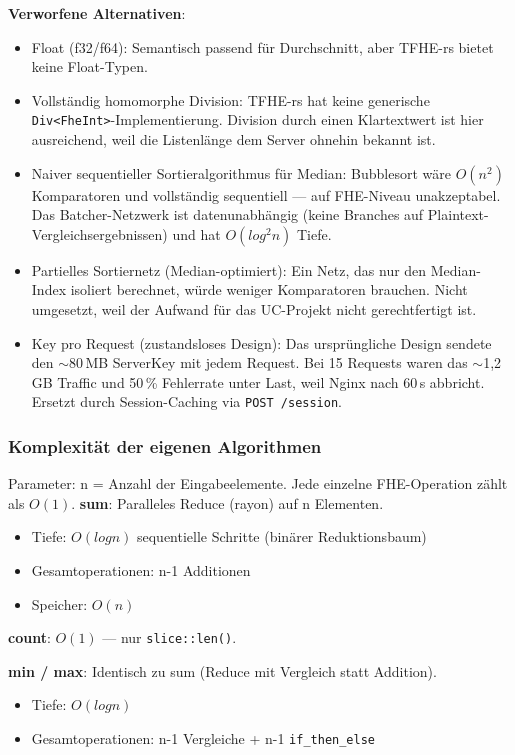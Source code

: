 \textbf{Verworfene Alternativen}:
\begin{itemize}
    \item Float (f32/f64): Semantisch passend für Durchschnitt, aber TFHE-rs bietet keine Float-Typen.
    \item Vollständig homomorphe Division: TFHE-rs hat keine generische \verb|Div<FheInt>|-Implementierung. Division durch einen Klartextwert ist hier ausreichend, weil die Listenlänge dem Server ohnehin bekannt ist.
    \item Naiver sequentieller Sortieralgorithmus für Median: Bubblesort wäre $O(n^2)$ Komparatoren und vollständig sequentiell — auf FHE-Niveau unakzeptabel. Das Batcher-Netzwerk ist datenunabhängig (keine Branches auf Plaintext-Vergleichsergebnissen) und hat $O(log^2n)$ Tiefe.
    \item Partielles Sortiernetz (Median-optimiert): Ein Netz, das nur den Median-Index isoliert berechnet, würde weniger Komparatoren brauchen. Nicht umgesetzt, weil der Aufwand für das UC-Projekt nicht gerechtfertigt ist.
    \item Key pro Request (zustandsloses Design): Das ursprüngliche Design sendete den $\sim$80\,MB ServerKey mit jedem Request. Bei 15 Requests waren das $\sim$1,2\,GB Traffic und 50\,\% Fehlerrate unter Last, weil Nginx nach 60\,s abbricht. Ersetzt durch Session-Caching via \verb|POST /session|.
\end{itemize}

\subsubsection{Komplexität der eigenen Algorithmen}
Parameter: n = Anzahl der Eingabeelemente. Jede einzelne FHE-Operation zählt als $O(1)$.
\textbf{sum}: 
Paralleles Reduce (rayon) auf n Elementen.
\begin{itemize}
    \item Tiefe: $O(log n)$ sequentielle Schritte (binärer Reduktionsbaum)
    \item Gesamtoperationen: n-1 Additionen
    \item Speicher: $O(n)$
\end{itemize}

\textbf{count}: 
$O(1)$ — nur \verb|slice::len()|.

\textbf{min / max}: 
Identisch zu sum (Reduce mit Vergleich statt Addition).
\begin{itemize}
    \item Tiefe: $O(log n)$
    \item Gesamtoperationen: n-1 Vergleiche + n-1 \verb|if_then_else|
\end{itemize}

